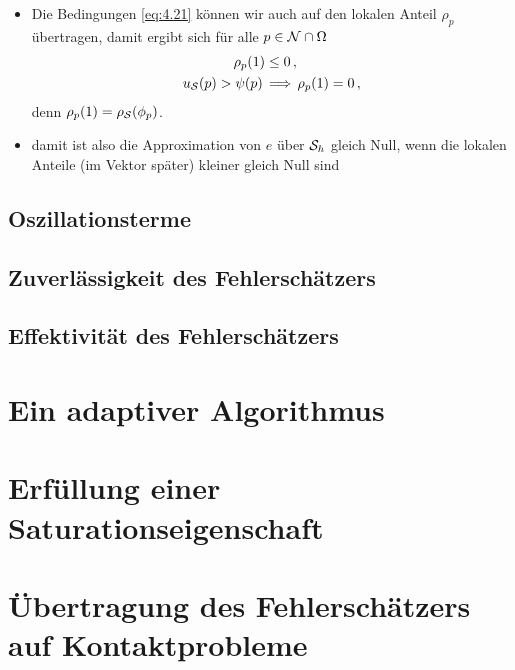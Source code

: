 \begin{itemize}
\item 
\begin{bem}
Die Bedingungen \eqref{eq:4.21} können wir auch auf den lokalen Anteil $\rho_p$ übertragen, damit ergibt sich für alle $p \in \mathcal N \cap \Omega$
\begin{subequations}\label{eq:4.22}
\begin{align}\label{eq:4.22a}
	\rho_p(1) &  \le 0\, ,  \\
	\label{eq:4.22b}
	u_{\mathcal S} (p) > \psi (p) \, & \Longrightarrow \, \rho_p(1) =0 \, ,
\end{align}
\end{subequations}
denn $\rho_p (1) = \rho_{\mathcal S} (\phi_p)$.
\end{bem}

\item damit ist also die Approximation von $e$ über $\mathcal S_h$ gleich Null, wenn die lokalen Anteile (im Vektor später) kleiner gleich Null sind

\end{itemize}






\subsection{Oszillationsterme}
\label{kap:4.1.3}



\subsection{Zuverlässigkeit des Fehlerschätzers}
\label{kap:4.1.4}



\subsection{Effektivität des Fehlerschätzers}
\label{kap:4.1.5}



\section{Ein adaptiver Algorithmus}
\label{kap:4.2}



\section{Erfüllung einer Saturationseigenschaft}
\label{kap:4.3}



\section{Übertragung des Fehlerschätzers auf Kontaktprobleme}
\label{kap:4.4}


\newpage

